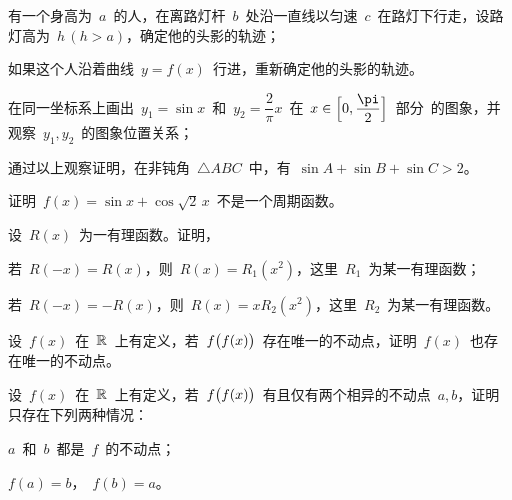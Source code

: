 \begin{exercise*}
\item\relax
\begin{exlist}
  \item 有一个身高为~$a$~的人，在离路灯杆~$b$~处沿一直线以匀速~$c$~在路灯下行走，设路灯高为~$h\,(h>a)$，确定他的头影的轨迹；
  \item 如果这个人沿着曲线~$y=f(x)$~行进，重新确定他的头影的轨迹。
\end{exlist}
\item\relax
\begin{exlist}
  \item 在同一坐标系上画出~$y_1=\sin x$~和~$y_2=\dfrac2\pi x$~在~$x\in\Brack[\Big]{0,\dfrac\pi2}$~部分~的图象，并
        观察~$y_1,y_2$~的图象位置关系；
  \item 通过以上观察证明，在非钝角~$\triangle\mathit{ABC}$~中，有~$\sin A+\sin B+\sin C>2$。
\end{exlist}
\item 证明~$f(x)=\sin x+\cos\sqrt 2\,x$~不是一个周期函数。
\item 设~$R(x)$~为一有理函数。证明，
\begin{exlist}
  \item 若~$R(-x)=R(x)$，则~$R(x)=R_1(x^2)$，这里~$R_1$~为某一有理函数；
  \item 若~$R(-x)=-R(x)$，则~$R(x)=x R_2(x^2)$，这里~$R_2$~为某一有理函数。
\end{exlist}
\item 设~$f(x)$~在~$\mathbb{R}$~上有定义，若~$f\bigl\lparen f(x)\bigr\rparen$~存在唯一的不动点，证明~$f(x)$~也存在唯一的不动点。
\item 设~$f(x)$~在~$\mathbb{R}$~上有定义，若~$f\bigl\lparen f(x)\bigr\rparen$~有且仅有两个相异的不动点~$a,b$，证明只存在下列两种情况：
\begin{exlistcols}
  \item $a$~和~$b$~都是~$f$~的不动点；
  \item $f(a)=b$，~$f(b)=a$。
\end{exlistcols}
\end{exercise*}




\endinput
